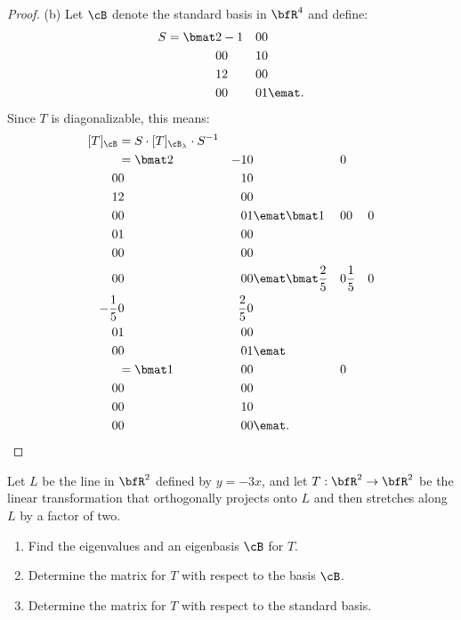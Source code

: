 \documentclass[10pt,twoside,openany]{memoir}
\begin{document}
\begin{proof}
        (b) Let $\cB$ denote the standard basis in $\bfR^4$ and define:
            \begin{equation*}
            \begin{split}
                S = \bmat 2 & -1 & 0 & 0 \\ 0 & 0 & 1 & 0 \\ 1 & 2 & 0 & 0 \\ 0 & 0 & 0 & 1 \emat.
            \end{split}
            \end{equation*}
        Since $T$ is diagonalizable, this means:
            \begin{equation*}
            \begin{split}
                [T]_{\cB} 
                & = S \cdot [T]_{\cB_\lambda}\cdot S^{-1} \\
                &= \bmat 2 & -1 & 0 & 0 \\ 0 & 0 & 1 & 0 \\ 1 & 2 & 0 & 0 \\ 0 & 0 & 0 & 1 \emat \bmat 1 & 0 & 0 & 0 \\ 0 & 1 & 0 & 0 \\ 0 & 0 & 0 & 0 \\ 0 & 0 & 0 & 0 \emat \bmat \frac{2}{5} & 0 & \frac{1}{5} & 0 \\ -\frac{1}{5} & 0 & \frac{2}{5} & 0 \\ 0 & 1 & 0 & 0 \\ 0 & 0 & 0 & 1 \emat \\
                & = \bmat1 & 0 & 0 & 0 \\ 0 & 0 & 0 & 0 \\ 0 & 0 & 1 & 0  \\ 0 & 0 & 0 & 0 \emat.
            \end{split}
            \end{equation*}
        
    \end{proof}
\begin{problem}
    Let $L$ be the line in $\bfR^2$ defined by $y = -3x$, and let $T:\bfR^2 \rightarrow \bfR^2$ be the linear transformation that orthogonally projects onto $L$ and then stretches along $L$ by a factor of two.
        \begin{enumerate}[label = (\alph*),itemsep=1pt,topsep=3pt]
            \item Find the eigenvalues and an eigenbasis $\cB$ for $T$.
            \item Determine the matrix for $T$ with respect to the basis $\cB$.
            \item Determine the matrix for $T$ with respect to the standard basis.
        \end{enumerate}
\end{problem}
\end{document}
